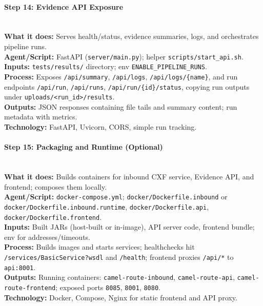 \documentclass[11pt,a4paper]{article}
\begin{document}
\paragraph{Step 14: Evidence API Exposure} \hfill\\
\textbf{What it does:} Serves health/status, evidence summaries, logs, and orchestrates pipeline runs.\\
\textbf{Agent/Script:} FastAPI (\texttt{server/main.py}); helper \texttt{scripts/start\_api.sh}.\\
\textbf{Inputs:} \texttt{tests/results/} directory; env \texttt{ENABLE\_PIPELINE\_RUNS}.\\
\textbf{Process:} Exposes \texttt{/api/summary}, \texttt{/api/logs}, \texttt{/api/logs/\{name\}}, and run endpoints \texttt{/api/run}, \texttt{/api/runs}, \texttt{/api/run/\{id\}/status}, copying run outputs under \texttt{uploads/\textless run\_id\textgreater{}/results}.\\
\textbf{Outputs:} JSON responses containing file tails and summary content; run metadata with metrics.\\
\textbf{Technology:} FastAPI, Uvicorn, CORS, simple run tracking.

\paragraph{Step 15: Packaging and Runtime (Optional)} \hfill\\
\textbf{What it does:} Builds containers for inbound CXF service, Evidence API, and frontend; composes them locally.\\
\textbf{Agent/Script:} \texttt{docker-compose.yml}; \texttt{docker/Dockerfile.inbound} or \texttt{docker/Dockerfile.inbound.runtime}, \texttt{docker/Dockerfile.api}, \texttt{docker/Dockerfile.frontend}.\\
\textbf{Inputs:} Built JARs (host-built or in-image), API server code, frontend bundle; env for addresses/timeouts.\\
\textbf{Process:} Builds images and starts services; healthchecks hit \texttt{/services/BasicService?wsdl} and \texttt{/health}; frontend proxies \texttt{/api/*} to \texttt{api:8001}.\\
\textbf{Outputs:} Running containers: \texttt{camel-route-inbound}, \texttt{camel-route-api}, \texttt{camel-route-frontend}; exposed ports \texttt{8085}, \texttt{8001}, \texttt{8080}.\\
\textbf{Technology:} Docker, Compose, Nginx for static frontend and API proxy.
\end{document}
